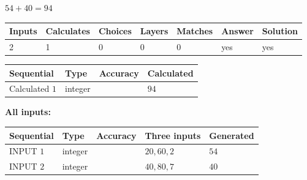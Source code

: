 \documentclass[12pt]{article}
\begin{document}
 
\noindent{}
 
 

$ %
54 +  %
40=   %
94$
 
 
\noindent{}
 
 

 
   
   
   
   
\noindent\begin{tabular}{|l|l|l|l|l|l|l|}
 \hline
Inputs & Calculates & Choices & Layers & Matches & Answer & Solution \\ \hline
 2  & 
 1  & 
 0
  & 
 0  & 
 0  & 
  yes & 
  yes 
  \\ \hline
 \end{tabular}
   
   
   
   
\noindent{}
   
   
  
  
\noindent\begin{tabular}{|l|l|l|l|}
\hline
 Sequential & Type & Accuracy & Calculated \\ 
\hline
 
 
  Calculated $  1 $ & integer &  & 
  $ 94 $ 
 \\  \hline  
 \end{tabular}
   
   
   
   
\noindent\vspace{0.1in}\hspace{-0.08in} {\textbf{\Large{All inputs: }}}
   
   
  
  
\noindent\begin{tabular}{|l|l|l|l|l|}
\hline
 Sequential & Type & Accuracy & Three inputs & Generated \\ 
\hline
 
 
  INPUT $  1 $ & integer &  & $
 20
 , 
 60
 , 
 2
 $ & $ 54 $ 
 \\  \hline  
 
 
  INPUT $  2 $ & integer &  & $
 40
 , 
 80
 , 
 7
 $ & $ 40 $ 
 \\  \hline  
 \end{tabular}
   
   
  
\end{document}
